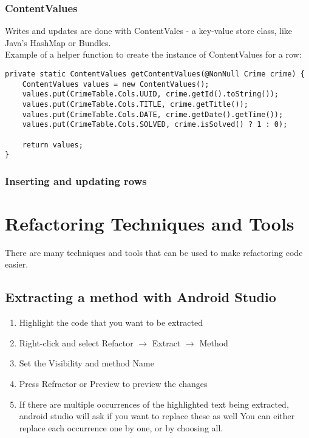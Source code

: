 \documentclass[]{article}
\begin{document}
\subsubsection{ContentValues}
Writes and updates are done with ContentVales - a key-value store class, like Java's HashMap or Bundles.
\\
Example of a helper function to create the instance of ContentValues for a row:
\begin{lstlisting}
private static ContentValues getContentValues(@NonNull Crime crime) {
	ContentValues values = new ContentValues();
	values.put(CrimeTable.Cols.UUID, crime.getId().toString());
	values.put(CrimeTable.Cols.TITLE, crime.getTitle());
	values.put(CrimeTable.Cols.DATE, crime.getDate().getTime());
	values.put(CrimeTable.Cols.SOLVED, crime.isSolved() ? 1 : 0);

	return values;
}
\end{lstlisting}

\subsubsection{Inserting and updating rows}


\section{Refactoring Techniques and Tools}
There are many techniques and tools that can be used to make refactoring code easier.
\subsection{Extracting a method with Android Studio}
\begin{enumerate}
	\item  Highlight the code that you want to be extracted
	\item Right-click and select Refactor $\rightarrow$ Extract $\rightarrow$ Method
	\item Set the Visibility and method Name 
	\item Press Refractor or Preview to preview the changes
	\item If there are multiple occurrences of the highlighted text being extracted, android studio will ask if you want to replace these as well 
	\subitem You can either replace each occurrence one by one, or by choosing all.
\end{enumerate}
\end{document}
